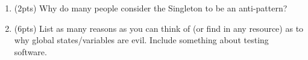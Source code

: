 \documentclass[11pt]{article}
\begin{document}
\begin{enumerate}
\begin{enumerate}
  \vspace{0.5in}

  \item (2pts) Why do many people consider the Singleton to be an anti-pattern?

  \vspace{0.5in}

  \item (6pts) List as many reasons as you can think of (or find in any resource) as to why global states/variables are evil. Include something about testing software. 

  \vfill

\end{enumerate}

\end{enumerate}
\end{document}
